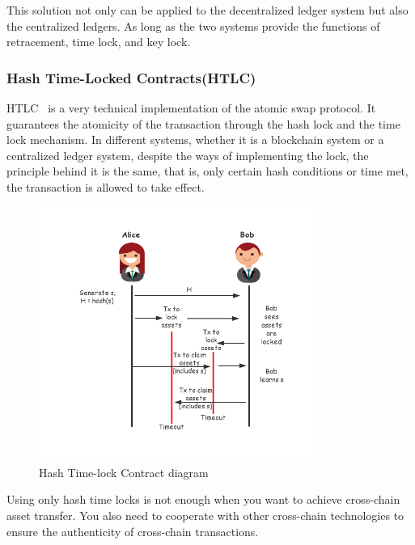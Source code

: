 \noindent This solution not only can be applied to the decentralized ledger system but also the centralized ledgers. As long as the two systems provide the functions of retracement, time lock, and key lock.

\subsubsection{Hash Time-Locked Contracts(HTLC)}
\noindent HTLC~\cite{russell2015lightning} is a very technical implementation of the atomic swap protocol. It guarantees the atomicity of the transaction through the hash lock and the time lock mechanism. In different systems, whether it is a blockchain system or a centralized ledger system, despite the ways of implementing the lock, the principle behind it is the same, that is, only certain hash conditions or time met, the transaction is allowed to take effect.

        \begin{figure}[H]
        \includegraphics[width=0.8\textwidth]{./figures/Hashlock.png}
        \centering
        \caption{Hash Time-lock Contract diagram}%
        \centering
        \label{fig:hash}
        \end{figure}
\noindent Using only hash time locks is not enough when you want to achieve cross-chain asset transfer. You also need to cooperate with other cross-chain technologies to ensure the authenticity of cross-chain transactions.



